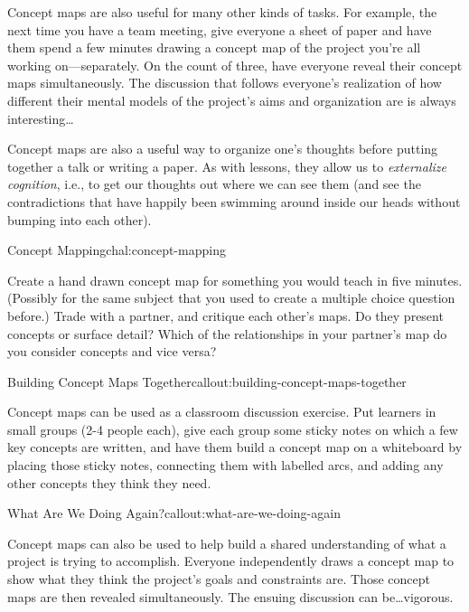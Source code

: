 Concept maps are also useful for many other kinds of tasks. For example,
the next time you have a team meeting, give everyone a sheet of paper
and have them spend a few minutes drawing a concept map of the project
you're all working on---separately. On the count of three, have everyone
reveal their concept maps simultaneously. The discussion that follows
everyone's realization of how different their mental models of the
project's aims and organization are is always interesting\ldots{}

Concept maps are also a useful way to organize one's thoughts before
putting together a talk or writing a paper. As with lessons, they allow
us to \emph{externalize cognition}, i.e., to get our thoughts out where
we can see them (and see the contradictions that have happily been
swimming around inside our heads without bumping into each other).

\begin{challenge}{Concept Mapping}{chal:concept-mapping}

Create a hand drawn concept map for something you would teach in five
minutes. (Possibly for the same subject that you used to create a
multiple choice question before.) Trade with a partner, and critique
each other's maps. Do they present concepts or surface detail? Which of
the relationships in your partner's map do you consider concepts and
vice versa?
\end{challenge}

\begin{callout}{Building Concept Maps Together}{callout:building-concept-maps-together}

Concept maps can be used as a classroom discussion exercise. Put
learners in small groups (2-4 people each), give each group some sticky
notes on which a few key concepts are written, and have them build a
concept map on a whiteboard by placing those sticky notes, connecting
them with labelled arcs, and adding any other concepts they think they
need.
\end{callout}

\begin{callout}{What Are We Doing Again?}{callout:what-are-we-doing-again}

Concept maps can also be used to help build a shared understanding of
what a project is trying to accomplish. Everyone independently draws a
concept map to show what they think the project's goals and constraints
are. Those concept maps are then revealed simultaneously. The ensuing
discussion can be\ldots{}vigorous.
\end{callout}

